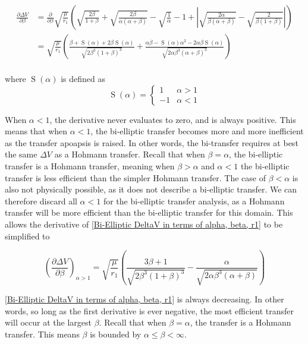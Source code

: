 \documentclass[../main.tex]{subfiles}
\begin{document}
\begin{align*}
    \frac{\partial\Delta V}{\partial\beta} & = \frac{\partial}{\partial\beta}\sqrt{\frac{\mu}{r_1}}\left(\sqrt{\frac{2\beta}{1+\beta}}+\sqrt{\frac{2\beta}{\alpha(\alpha+\beta)}}-\sqrt{\frac{1}{\alpha}}-1+\left|\sqrt{\frac{2\alpha}{\beta(\alpha+\beta)}}-\sqrt{\frac{2}{\beta(1+\beta)}}\right|\right)         \\
                                           & = \sqrt{\frac{\mu}{r_1}}\left(\frac{\beta+\operatorname{S}(\alpha)+2\beta\operatorname{S}(\alpha)}{\sqrt{2\beta^3(1+\beta)^3}}+\frac{\alpha\beta-\operatorname{S}(\alpha)\alpha^2-2\alpha\beta\operatorname{S}(\alpha)}{\sqrt{2\alpha\beta^3(\alpha+\beta)^3}}\right) \\
\end{align*}

where $\operatorname{S}(\alpha)$ is defined as
\begin{equation*}
    \operatorname{S}(\alpha)=\begin{cases}
        1  & \alpha>1 \\
        -1 & \alpha<1
    \end{cases}
\end{equation*}

When $\alpha<1$, the derivative never evaluates to zero, and is always positive. This means that when $\alpha<1$, the bi-elliptic transfer becomes more and more inefficient as the transfer apoapsis is raised. In other words, the bi-transfer requires at best the same $\Delta V$ as a Hohmann transfer. Recall that when $\beta=\alpha$, the bi-elliptic transfer is a Hohmann transfer, meaning when $\beta>\alpha$ and $\alpha<1$ the bi-elliptic transfer is less efficient than the simpler Hohmann transfer. The case of $\beta<\alpha$ is also not physically possible, as it does not describe a bi-elliptic transfer. We can therefore discard all $\alpha<1$ for the bi-elliptic transfer analysis, as a Hohmann transfer will be more efficient than the bi-elliptic transfer for this domain. This allows the derivative of \eqref{Bi-Elliptic DeltaV in terms of alpha, beta, r1} to be simplified to

\begin{equation}\label{Bielliptic DV derivative}
    \left(\frac{\partial\Delta V}{\partial\beta}\right)_{\alpha>1} = \sqrt{\frac{\mu}{r_1}}\left(\frac{3\beta+1}{\sqrt{2\beta^3(1+\beta)^3}}-\frac{\alpha}{\sqrt{2\alpha\beta^3(\alpha+\beta)}}\right)
\end{equation}

\eqref{Bi-Elliptic DeltaV in terms of alpha, beta, r1} is always decreasing. In other words, so long as the first derivative is ever negative, the most efficient transfer will occur at the largest $\beta$. Recall that when $\beta=\alpha$, the transfer is a Hohmann transfer. This means $\beta$ is bounded by $\alpha\leq\beta<\infty$.
\end{document}
